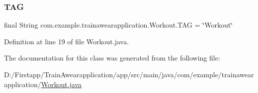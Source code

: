 \subsubsection{\texorpdfstring{TAG}{TAG}}
{\footnotesize\ttfamily final String com.\+example.\+trainawearapplication.\+Workout.\+T\+AG = \char`\"{}Workout\char`\"{}\hspace{0.3cm}{\ttfamily [package]}}



Definition at line 19 of file Workout.\+java.



The documentation for this class was generated from the following file\+:\begin{DoxyCompactItemize}
\item 
D\+:/\+Firstapp/\+Train\+Awearapplication/app/src/main/java/com/example/trainawearapplication/\mbox{\hyperlink{_workout_8java}{Workout.\+java}}\end{DoxyCompactItemize}
